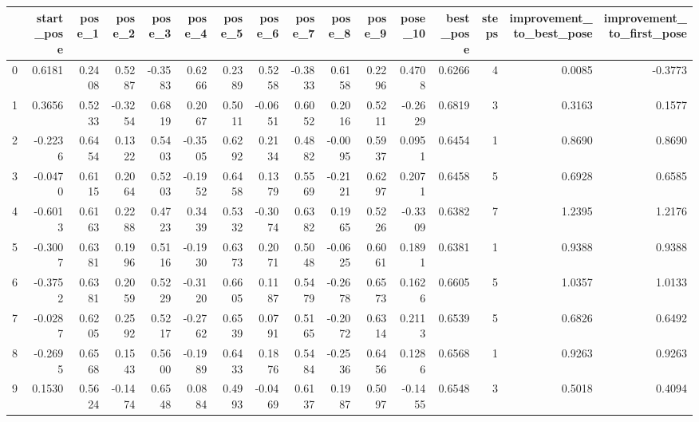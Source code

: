 \begin{tabular}{lrrrrrrrrrrrrrrr}
\toprule
{} &  start\_pose &  pose\_1 &  pose\_2 &  pose\_3 &  pose\_4 &  pose\_5 &  pose\_6 &  pose\_7 &  pose\_8 &  pose\_9 &  pose\_10 &  best\_pose &  steps &  improvement\_to\_best\_pose &  improvement\_to\_first\_pose \\
\midrule
0  &      0.6181 &  0.2408 &  0.5287 & -0.3583 &  0.6266 &  0.2389 &  0.5258 & -0.3833 &  0.6158 &  0.2296 &   0.4708 &     0.6266 &      4 &                    0.0085 &                    -0.3773 \\
1  &      0.3656 &  0.5233 & -0.3254 &  0.6819 &  0.2067 &  0.5011 & -0.0651 &  0.6052 &  0.2016 &  0.5211 &  -0.2629 &     0.6819 &      3 &                    0.3163 &                     0.1577 \\
2  &     -0.2236 &  0.6454 &  0.1322 &  0.5403 & -0.3505 &  0.6292 &  0.2134 &  0.4882 & -0.0095 &  0.5937 &   0.0951 &     0.6454 &      1 &                    0.8690 &                     0.8690 \\
3  &     -0.0470 &  0.6115 &  0.2064 &  0.5203 & -0.1952 &  0.6458 &  0.1379 &  0.5569 & -0.2121 &  0.6297 &   0.2071 &     0.6458 &      5 &                    0.6928 &                     0.6585 \\
4  &     -0.6013 &  0.6163 &  0.2288 &  0.4723 &  0.3439 &  0.5332 & -0.3074 &  0.6382 &  0.1965 &  0.5226 &  -0.3309 &     0.6382 &      7 &                    1.2395 &                     1.2176 \\
5  &     -0.3007 &  0.6381 &  0.1996 &  0.5116 & -0.1930 &  0.6373 &  0.2071 &  0.5048 & -0.0625 &  0.6061 &   0.1891 &     0.6381 &      1 &                    0.9388 &                     0.9388 \\
6  &     -0.3752 &  0.6381 &  0.2059 &  0.5229 & -0.3120 &  0.6605 &  0.1187 &  0.5479 & -0.2678 &  0.6573 &   0.1626 &     0.6605 &      5 &                    1.0357 &                     1.0133 \\
7  &     -0.0287 &  0.6205 &  0.2592 &  0.5217 & -0.2762 &  0.6539 &  0.0791 &  0.5165 & -0.2072 &  0.6314 &   0.2113 &     0.6539 &      5 &                    0.6826 &                     0.6492 \\
8  &     -0.2695 &  0.6568 &  0.1543 &  0.5600 & -0.1989 &  0.6433 &  0.1876 &  0.5484 & -0.2536 &  0.6456 &   0.1286 &     0.6568 &      1 &                    0.9263 &                     0.9263 \\
9  &      0.1530 &  0.5624 & -0.1474 &  0.6548 &  0.0884 &  0.4993 & -0.0469 &  0.6137 &  0.1987 &  0.5097 &  -0.1455 &     0.6548 &      3 &                    0.5018 &                     0.4094 \\

\end{tabular}
